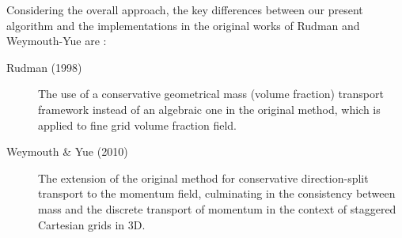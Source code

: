 Considering the overall approach, the key differences between our 
present algorithm and the implementations in the 
original works of Rudman and Weymouth-Yue are : 

\begin{description}
	\item[Rudman (1998)\cite{rudman1998volume} ] The use of a conservative geometrical 
		mass (volume fraction) transport framework instead of an algebraic one in 
		the original method, which is applied to fine grid volume fraction field.  
	\item[Weymouth \& Yue (2010) \cite{weymouth2010conservative}] The extension of the 
		original method for conservative direction-split transport to the momentum field, 
		culminating in the consistency between mass and the discrete transport of 
		momentum in the context of staggered Cartesian grids in 3D. 
\end{description}


